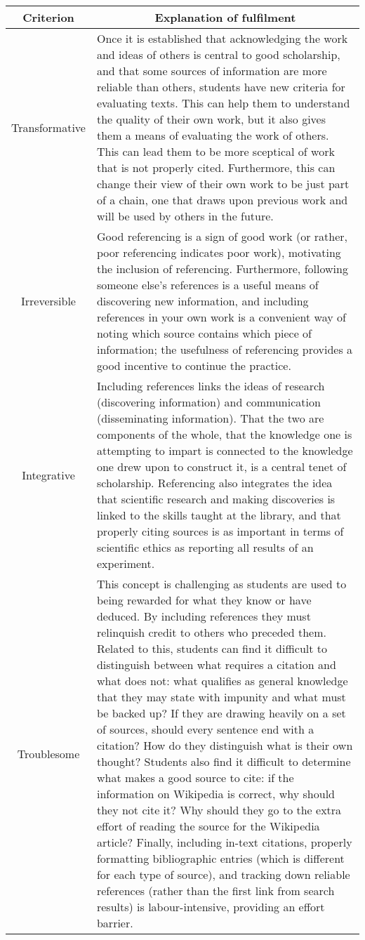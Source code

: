 \begin{table}\scriptsize
\centering
\begin{tabular}{c p{4.5in}}
\toprule
\multicolumn{1}{c}{Criterion} &  \multicolumn{1}{c}{Explanation of fulfilment} \\
\midrule 
\multirow{1}{*}{Transformative}	 & Once it is established that acknowledging the work and ideas of others is central to good scholarship, and that some sources of information are more reliable than others, students have new criteria for evaluating texts. This can help them to understand the quality of their own work, but it also gives them a means of evaluating the work of others. This can lead them to be more sceptical of work that is not properly cited. Furthermore, this can change their view of their own work to be just part of a chain, one that draws upon previous work and will be used by others in the future. \\
\multirow{1}{*}{Irreversible}	 & Good referencing is a sign of good work (or rather, poor referencing indicates poor work), motivating the inclusion of referencing. Furthermore, following someone else's references is a useful means of discovering new information, and including references in your own work is a convenient way of noting which source contains which piece of information; the usefulness of referencing provides a good incentive to continue the practice. \\
\multirow{1}{*}{Integrative}	 & Including references links the ideas of research (discovering information) and communication (disseminating information). That the two are components of the whole, that the knowledge one is attempting to impart is connected to the knowledge one drew upon to construct it, is a central tenet of scholarship. Referencing also integrates the idea that scientific research and making discoveries is linked to the skills taught at the library, and that properly citing sources is as important in terms of scientific ethics as reporting all results of an experiment.  \\
\multirow{1}{*}{Troublesome}	 & This concept is challenging as students are used to being rewarded for what they know or have deduced. By including references they must relinquish credit to others who preceded them. Related to this, students can find it difficult to distinguish between what requires a citation and what does not: what qualifies as general knowledge that they may state with impunity and what must be backed up? If they are drawing heavily on a set of sources, should every sentence end with a citation? How do they distinguish what is their own thought? Students also find it difficult to determine what makes a good source to cite: if the information on Wikipedia is correct, why should they not cite it? Why should they go to the extra effort of reading the source for the Wikipedia article? Finally, including in-text citations, properly formatting bibliographic entries (which is different for each type of source), and tracking down reliable references (rather than the first link from  search results) is labour-intensive, providing an effort barrier. \\

\end{tabular}
\end{table}
